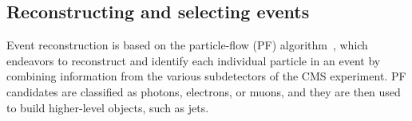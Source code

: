 \subsection{Reconstructing and selecting events} \label{sec:recoandsel}



Event reconstruction is based on the particle-flow (PF) algorithm~\cite{Sirunyan:2017ulk}, which endeavors to reconstruct and identify each individual particle in an event by combining information from the various subdetectors of the CMS experiment. PF candidates are classified as photons, electrons, or muons, and they are then used to build higher-level objects, such as jets. 

